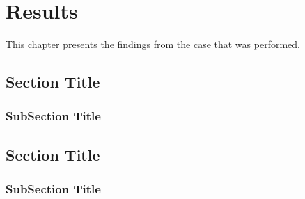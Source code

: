 \chapter{Results}
This chapter presents the findings from the case that was performed.
\section{Section Title}

\subsection{SubSection Title}

\section{Section Title}


\subsection{SubSection Title}

